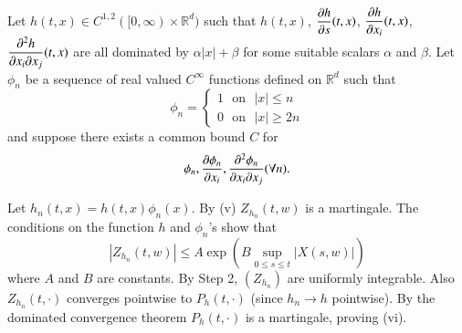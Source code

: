 \begin{step}%
Let $h(t,x)\in C^{1,2}([0,\infty)\times \mathbb{R}^{d})$ such that
  $h(t,x)$, $\dfrac{\partial h}{\partial s}(t,x)$, $\dfrac{\partial h}{\partial x_{i}}(t,x)$,
  $\dfrac{\partial^{2}h}{\partial x_{i}\partial x_{j}}(t,x)$ are all dominated by
  $\alpha|x|+\beta$ for some suitable scalars $\alpha$ and
  $\beta$. Let $\phi_{n}$ be a sequence of real valued $C^{\infty}$
  functions defined on $\mathbb{R}^{d}$ such that
$$
\phi_{n}=
\begin{cases}
1\text{~ on~ } |x|\leq n\\
0\text{~ on~ }|x|\geq 2n
\end{cases}
$$
and suppose there exists a common bound $C$ for
$$
\phi_{n},\frac{\partial \phi_{n}}{\partial x_{i}},\frac{\partial^{2}\phi_{n}}{\partial x_{i}\partial
  x_{j}}(\forall n).
$$

Let $h_{n}(t,x)=h(t,x)\phi_{n}(x)$. By (v) $Z_{h_{n}}(t,w)$ is a
martingale. The conditions on the function $h$ and $\phi_{n}$'s show
that
$$
|Z_{h_{n}}(t,w)|\leq A\exp \left(B\sup\limits_{0\leq s\leq t}|X(s,w)|\right)
$$
where $A$ and $B$ are constants. By Step 2, $(Z_{h_{n}})$ are
uniformly integrable. Also $Z_{h_{n}}(t,\cdot)$ converges pointwise to
$P_{h}(t,\cdot)$ (since $h_{n}\to h$ pointwise). By the dominated
convergence theorem $P_{h}(t,\cdot)$ is a martingale, proving (vi).
\end{step}





